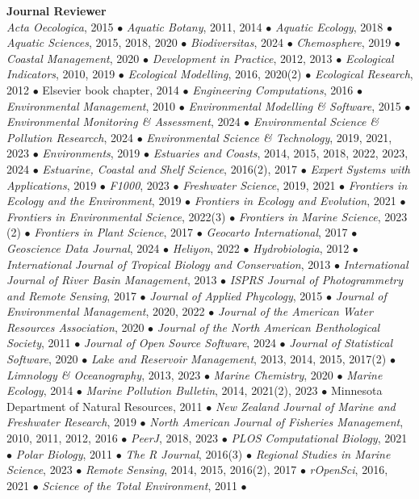 \documentclass[letterpaper,12pt]{article}
\begin{document}
{\bf Journal Reviewer}\hfill \\
\textit{Acta Oecologica}, 2015 $\bullet$ \textit{Aquatic Botany}, 2011, 2014 $\bullet$ \textit{Aquatic Ecology}, 2018 $\bullet$ \textit{Aquatic Sciences}, 2015, 2018, 2020 $\bullet$ \textit{Biodiversitas}, 2024 $\bullet$ \textit{Chemosphere}, 2019 $\bullet$ \textit{Coastal Management}, 2020 $\bullet$ \textit{Development in Practice}, 2012, 2013 $\bullet$ \textit{Ecological Indicators}, 2010, 2019 $\bullet$ \textit{Ecological Modelling}, 2016, 2020(2) $\bullet$ \textit{Ecological Research}, 2012 $\bullet$ Elsevier book chapter, 2014 $\bullet$ \textit{Engineering Computations}, 2016 $\bullet$ \textit{Environmental Management}, 2010 $\bullet$ \textit{Environmental Modelling \& Software}, 2015 $\bullet$ \textit{Environmental Monitoring \& Assessment}, 2024 $\bullet$ \textit{Environmental Science \& Pollution Researcch}, 2024 $\bullet$ \textit{Environmental Science \& Technology}, 2019, 2021, 2023 $\bullet$ \textit{Environments}, 2019 $\bullet$ \textit{Estuaries and Coasts}, 2014, 2015, 2018, 2022, 2023, 2024 $\bullet$ \textit{Estuarine, Coastal and Shelf Science}, 2016(2), 2017 $\bullet$ \textit{Expert Systems with Applications}, 2019 $\bullet$ \textit{F1000}, 2023 $\bullet$ \textit{Freshwater Science}, 2019, 2021 $\bullet$ \textit{Frontiers in Ecology and the Environment}, 2019 $\bullet$ \textit{Frontiers in Ecology and Evolution}, 2021 $\bullet$ \textit{Frontiers in Environmental Science}, 2022(3) $\bullet$ \textit{Frontiers in Marine Science}, 2023 (2) $\bullet$ \textit{Frontiers in Plant Science}, 2017 $\bullet$ \textit{Geocarto International}, 2017 $\bullet$ \textit{Geoscience Data Journal}, 2024 $\bullet$ \textit{Heliyon}, 2022 $\bullet$ \textit{Hydrobiologia}, 2012 $\bullet$ \textit{International Journal of Tropical Biology and Conservation}, 2013 $\bullet$ \textit{International Journal of River Basin Management}, 2013 $\bullet$ \textit{ISPRS Journal of Photogrammetry and Remote Sensing}, 2017 $\bullet$ \textit{Journal of Applied Phycology}, 2015 $\bullet$ \textit{Journal of Environmental Management}, 2020, 2022 $\bullet$ \textit{Journal of the American Water Resources Association}, 2020 $\bullet$ \textit{Journal of the North American Benthological Society}, 2011 $\bullet$ \textit{Journal of Open Source Software}, 2024 $\bullet$ \textit{Journal of Statistical Software}, 2020 $\bullet$ \textit{Lake and Reservoir Management}, 2013, 2014, 2015, 2017(2) $\bullet$ \textit{Limnology \& Oceanography}, 2013, 2023 $\bullet$ \textit{Marine Chemistry}, 2020 $\bullet$ \textit{Marine Ecology}, 2014 $\bullet$ \textit{Marine Pollution Bulletin}, 2014, 2021(2), 2023 $\bullet$ Minnesota Department of Natural Resources, 2011 $\bullet$ \textit{New Zealand Journal of Marine and Freshwater Research}, 2019 $\bullet$ \textit{North American Journal of Fisheries Management}, 2010, 2011, 2012, 2016 $\bullet$ \textit{PeerJ}, 2018, 2023 $\bullet$ \textit{PLOS Computational Biology}, 2021 $\bullet$ \textit{Polar Biology}, 2011 $\bullet$ \textit{The R Journal}, 2016(3) $\bullet$ \textit{Regional Studies in Marine Science}, 2023 $\bullet$ \textit{Remote Sensing}, 2014, 2015, 2016(2), 2017 $\bullet$ \textit{rOpenSci}, 2016, 2021 $\bullet$ \textit{Science of the Total Environment}, 2011 $\bullet$ 
\end{document}
